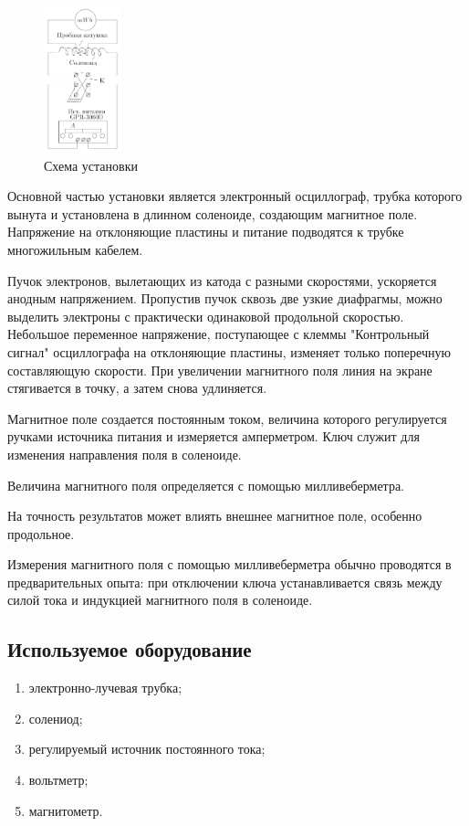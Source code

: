\documentclass[a4paper, 12pt]{article}
\begin{document}
\begin{figure}
  \begin{center}
    \includegraphics[width = 0.2\textwidth]{1.png}
  \end{center}
  \caption{Схема установки}
\end{figure}
Основной частью установки является электронный осциллограф, трубка которого вынута и установлена в длинном соленоиде, создающим магнитное поле. Напряжение на отклоняющие пластины и питание подводятся к трубке многожильным кабелем.

Пучок электронов, вылетающих из катода с разными скоростями, ускоряется анодным напряжением. Пропустив пучок сквозь две узкие диафрагмы, можно выделить электроны с практически одинаковой продольной скоростью. Небольшое переменное напряжение, поступающее с клеммы "Контрольный сигнал" осциллографа на отклоняющие пластины, изменяет только поперечную составляющую скорости. При увеличении магнитного поля линия на экране стягивается в точку, а затем снова удлиняется. 

Магнитное поле создается постоянным током, величина которого регулируется ручками источника питания и измеряется амперметром. Ключ служит для изменения направления поля в соленоиде.

Величина магнитного поля определяется с помощью милливеберметра.

На точность результатов может влиять внешнее магнитное поле, особенно продольное. 

Измерения магнитного поля с помощью милливеберметра обычно проводятся в предварительных опыта: при отключении ключа устанавливается связь между силой тока и индукцией магнитного поля в соленоиде. 

\subsection{Используемое оборудование}

\begin{enumerate}
    \item электронно-лучевая трубка;
    \item солениод;
    \item регулируемый источник постоянного тока;
    \item вольтметр;
    \item магнитометр.
\end{enumerate}
\end{document}
